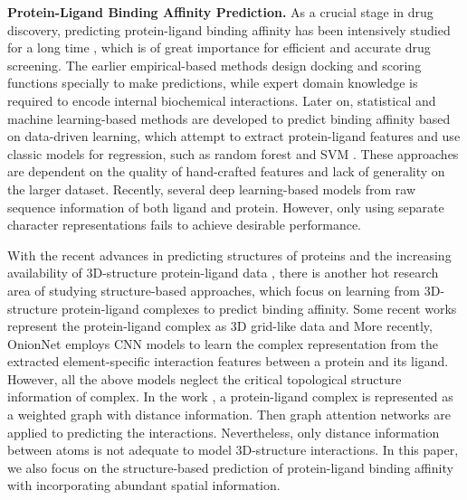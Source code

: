 \documentclass[sigconf]{acmart}
\begin{document}
{\bfseries Protein-Ligand Binding Affinity Prediction.}
As a crucial stage in drug discovery, predicting protein-ligand binding affinity has been intensively studied for a long time , which is of great importance for efficient and accurate drug screening. The earlier empirical-based methods \cite{gohlke2000knowledge, wang2002further,trott2010autodock} design docking and scoring functions specially to make predictions, while expert domain knowledge is required to encode internal biochemical interactions. Later on, statistical and machine learning-based methods \cite{colwell2018statistical} are developed to predict binding affinity based on data-driven learning, which attempt to extract protein-ligand features and use classic models for regression, such as random forest \cite{ballester2010machine} and SVM \cite{kinnings2011machine}. These approaches are dependent on the quality of hand-crafted features and lack of generality on the larger dataset. Recently, several deep learning-based models \cite{ozturk2018deepdta}  from raw sequence information of both ligand and protein. However, only using separate character representations fails to achieve desirable performance.

With the recent advances in predicting structures of proteins \cite{callaway2020will} and the increasing availability of 3D-structure protein-ligand data \cite{wang2005pdbbind}, there is another hot research area of studying structure-based approaches, which focus on learning from 3D-structure protein-ligand complexes to predict binding affinity. Some recent works \cite{ragoza2017protein, stepniewska2018development} represent the protein-ligand complex as 3D grid-like data and  More recently, OnionNet \cite{zheng2019onionnet} employs CNN models to learn the complex representation from the extracted element-specific interaction features between a protein and its ligand. However, all the above models neglect the critical topological structure information of complex. In the work \cite{lim2019predicting}, a protein-ligand complex is represented as a weighted graph with distance information. Then graph attention networks are applied to predicting the interactions. Nevertheless, only distance information between atoms is not adequate to model 3D-structure interactions. In this paper, we also focus on the structure-based prediction of protein-ligand binding affinity with incorporating abundant spatial information.
\end{document}
